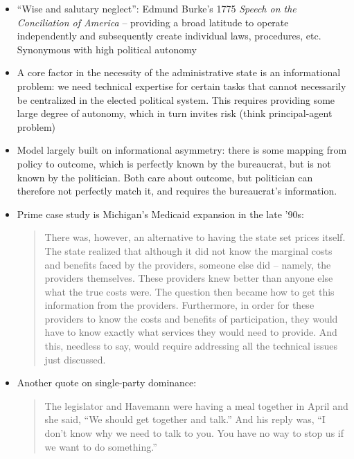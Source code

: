 \documentclass[12pt]{article}
\begin{document}
\begin{itemize}[leftmargin=*, itemsep=4pt]
    \item ``Wise and salutary neglect'': Edmund Burke's 1775 \emph{Speech on the Conciliation of America} -- providing a broad latitude to operate independently and subsequently create individual laws, procedures, etc. Synonymous with high political autonomy
    \item A core factor in the necessity of the administrative state is an informational problem: we need technical expertise for certain tasks that cannot necessarily be centralized in the elected political system. This requires providing some large degree of autonomy, which in turn invites risk (think principal-agent problem)
    \item Model largely built on informational asymmetry: there is some mapping from policy to outcome, which is perfectly known by the bureaucrat, but is not known by the politician. Both care about outcome, but politician can therefore not perfectly match it, and requires the bureaucrat's information.
    \item Prime case study is Michigan's Medicaid expansion in the late '90s: \\
    \begin{quote}
        There was, however, an alternative to having the state set prices itself. The state realized that although it did not know the marginal costs and benefits faced by the providers, someone else did -- namely, the providers themselves. These providers knew better than anyone else what the true costs were. The question then became how to get this information from the providers. Furthermore, in order for these providers to know the costs and benefits of participation, they would have to know exactly what services they would need to provide. And this, needless to say, would require addressing all the technical issues just discussed.
    \end{quote}
    \item Another quote on single-party dominance: \\
    \begin{quotation}
        The legislator and Havemann were having a meal together in April and she said, ``We should get together and talk.'' And his reply was, ``I don't know why we need to talk to you. You have no way to stop us if we want to do something.''
    \end{quotation} 

\end{itemize}
\end{document}
